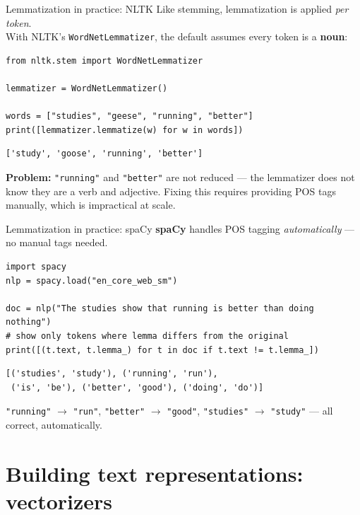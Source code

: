 \documentclass[handout]{beamer}
\begin{document}
\begin{frame}[fragile]{Lemmatization in practice: NLTK}
Like stemming, lemmatization is applied \emph{per token}.\\
With NLTK's \texttt{WordNetLemmatizer}, the default assumes every token is a \textbf{noun}:

\begin{verbatim}
from nltk.stem import WordNetLemmatizer

lemmatizer = WordNetLemmatizer()

words = ["studies", "geese", "running", "better"]
print([lemmatizer.lemmatize(w) for w in words])
\end{verbatim}

\pause

\begin{verbatim}
['study', 'goose', 'running', 'better']
\end{verbatim}

\pause
\small \textbf{Problem:} \texttt{"running"} and \texttt{"better"} are not reduced --- the lemmatizer does not know they are a verb and adjective. Fixing this requires providing POS tags manually, which is impractical at scale.
\end{frame}

\begin{frame}[fragile]{Lemmatization in practice: spaCy}
\textbf{spaCy} handles POS tagging \emph{automatically} --- no manual tags needed.

\begin{verbatim}
import spacy
nlp = spacy.load("en_core_web_sm")

doc = nlp("The studies show that running is better than doing nothing")
# show only tokens where lemma differs from the original
print([(t.text, t.lemma_) for t in doc if t.text != t.lemma_])
\end{verbatim}

\pause

\begin{verbatim}
[('studies', 'study'), ('running', 'run'),
 ('is', 'be'), ('better', 'good'), ('doing', 'do')]
\end{verbatim}

\pause
\small \texttt{"running"} $\to$ \texttt{"run"}, \texttt{"better"} $\to$ \texttt{"good"}, \texttt{"studies"} $\to$ \texttt{"study"} --- all correct, automatically.
\end{frame}

\section{Building text representations: vectorizers}
\end{document}
